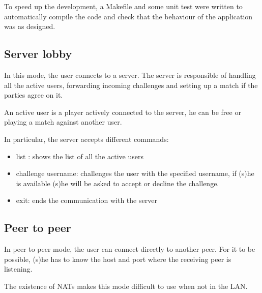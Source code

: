 To speed up the development, a Makefile and some unit test were written to automatically compile the code and check that the behaviour of the application was as designed.

\subsection{Server lobby}
In this mode, the user connects to a server. The server is responsible of handling all the active users, forwarding incoming challenges and setting up a match if the parties agree on it.


An active user is a player actively connected to the server, he can be free or playing a match against another user.

In particular, the server accepts different commands:
\begin{itemize}
	\item list : shows the list of all the active users
	\item challenge username:  challenges the user with the specified username, if (s)he is available (s)he will be asked to accept or decline the challenge.
	\item exit: ends the communication with the server
\end{itemize}

\subsection{Peer to peer}
In peer to peer mode, the user can connect directly to another peer. For it to be possible, (s)he has to know the host and port where the receiving peer is listening.


The existence of NATs makes this mode difficult to use when not in the LAN.

